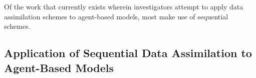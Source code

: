 Of the work that currently exists wherein investigators attempt to apply data
assimilation schemes to agent-based models, most make use of sequential schemes. 

\subsection[Application of Data Assimilation to Agent-Based Models]{Application of Sequential Data Assimilation to Agent-Based
Models}\label{sub:lit_rev:da_abm}





